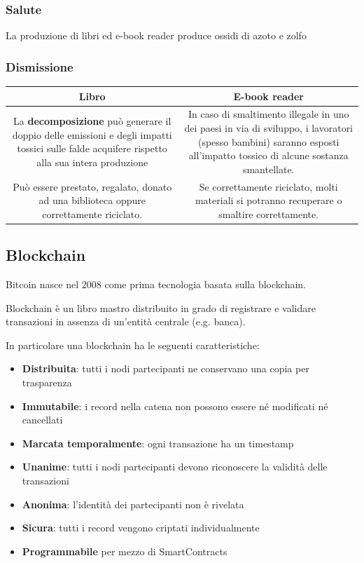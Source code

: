 \subsubsection{Salute}
La produzione di libri ed e-book reader produce ossidi di azoto e zolfo %

\subsubsection{Dismissione}
\begin{table}
	\begin{tabular}{|c|c|}
		\hline
		Libro & E-book reader \\
		\hline
		La \textbf{decomposizione} può generare il doppio delle emissioni e degli impatti tossici sulle falde acquifere rispetto alla sua intera produzione & In caso di smaltimento illegale in uno dei paesi in via di sviluppo, i lavoratori (spesso bambini) saranno esposti all'impatto tossico di alcune sostanza smantellate. \\
		Può essere prestato, regalato, donato ad una biblioteca oppure correttamente riciclato. & Se correttamente riciclato, molti materiali si potranno recuperare o smaltire correttamente.
	\end{tabular}
\end{table}

\subsection{Blockchain}
Bitcoin nasce nel 2008 come prima tecnologia basata sulla blockchain.
\begin{definition}[Blockchain]
	Blockchain è un libro mastro distribuito in grado di registrare e validare transazioni in assenza di un’entità centrale (e.g. banca).
\end{definition}
In particolare una blockchain ha le seguenti caratteristiche:
\begin{itemize}
	\item \textbf{Distribuita}: tutti i nodi partecipanti ne conservano una copia per trasparenza
	\item \textbf{Immutabile}: i record nella catena non possono essere né modificati né cancellati
	\item \textbf{Marcata temporalmente}: ogni transazione ha un timestamp
	\item \textbf{Unanime}: tutti i nodi partecipanti devono riconoscere la validità delle transazioni
	\item \textbf{Anonima}: l’identità dei partecipanti non è rivelata
	\item \textbf{Sicura}: tutti i record vengono criptati individualmente
	\item \textbf{Programmabile} per mezzo di SmartContracts
\end{itemize}


